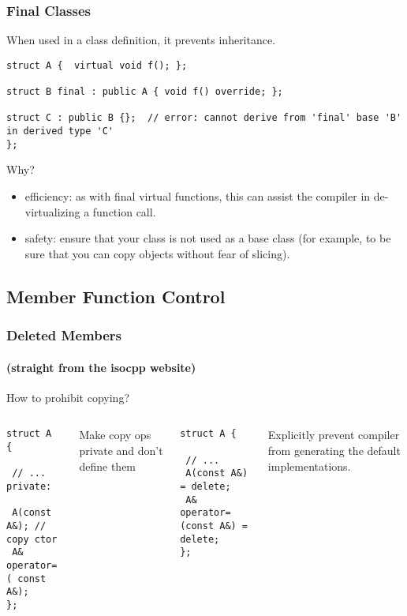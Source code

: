 
\begin{frame}[fragile]
\frametitle{Final Classes}
When used in a class definition, it prevents inheritance.
{\scriptsize
\begin{verbatim}
struct A {  virtual void f(); };

struct B final : public A { void f() override; };

struct C : public B {};  // error: cannot derive from 'final' base 'B' in derived type 'C'
};
\end{verbatim}
}
Why?
\begin{itemize}
\item efficiency: as with final virtual functions, this can assist the
  compiler in de-virtualizing a function call.
\item safety: ensure that your class is not used as a base class (for example, to be sure that you can copy objects without fear of slicing).
\end{itemize}

    
\end{frame}


\subsection{Member Function Control}

\begin{frame}[fragile]
\frametitle{Deleted Members}
\framesubtitle{(straight from the isocpp website)}
How to prohibit copying?
\begin{columns}[t]
{\scriptsize

\begin{verbatim}
struct A {

 // ...
private:

 A(const A&); // copy ctor
 A& operator=( const A&);
};
\end{verbatim}

Make copy ops private and don't define them
}
\pause{}
{\scriptsize
\begin{verbatim}
struct A {

 // ...
 A(const A&) = delete;
 A& operator=(const A&) = delete;
};
\end{verbatim}

Explicitly prevent compiler from generating the default implementations.
}
\end{columns}

\end{frame}


